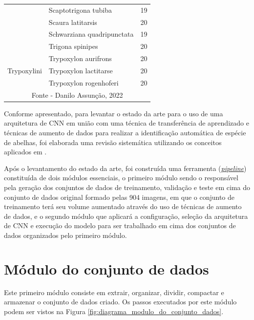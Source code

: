 \documentclass[
	12pt,				%
	oneside,			%
	a4paper,			%
	english,			%
	brazil				%
	]{abntex2ppgsi}
\begin{document}
\begin{longtable}[c]{|l|l|r|}
                       & Scaptotrigona tubiba               & 19 \\ \cline{2-3} 
                       & Scaura latitarsis                  & 20 \\ \cline{2-3} 
                       & Schwarziana quadripunctata         & 19 \\ \cline{2-3} 
                       & Trigona spinipes                   & 20 \\ \hline
\multirow{3}{*}{Trypoxylini} 
                       & Trypoxylon aurifrons   & 20 \\ \cline{2-3} 
                       & Trypoxylon lactitarse  & 20 \\ \cline{2-3} 
                       & Trypoxylon rogenhoferi & 20 \\ \hline

\multicolumn{3}{|c|}{Fonte - Danilo Assunção, 2022} \\ \hline
\end{longtable}

Conforme apresentado, para levantar o estado da arte para o uso de uma arquitetura de CNN em união com uma técnica de transferência de aprendizado e técnicas de aumento de dados para realizar a identificação automática de espécie de abelhas, foi elaborada uma revisão sistemática utilizando os conceitos aplicados em .

Após o levantamento do estado da arte, foi construída uma ferramenta (\href{https://github.com/danilo-assuncao/bee-masters-project/tree/main/tools/colab-notebooks}{\textit{pipeline}}) constituída de dois módulos essenciais, o primeiro módulo sendo o responsável pela geração dos conjuntos de dados de treinamento, validação e teste em cima do conjunto de dados original formado pelas 904 imagens, em que o conjunto de treinamento terá seu volume aumentado através do uso de técnicas de aumento de dados, e o segundo módulo que aplicará a configuração, seleção da arquitetura de CNN e execução do modelo para ser trabalhado em cima dos conjuntos de dados organizados pelo primeiro módulo.

\section{Módulo do conjunto de dados}
Este primeiro módulo consiste em extrair, organizar, dividir, compactar e armazenar o conjunto de dados criado. Os passos executados por este módulo podem ser vistos na Figura \ref{fig:diagrama_modulo_do_conjunto_dados}.
\end{document}
